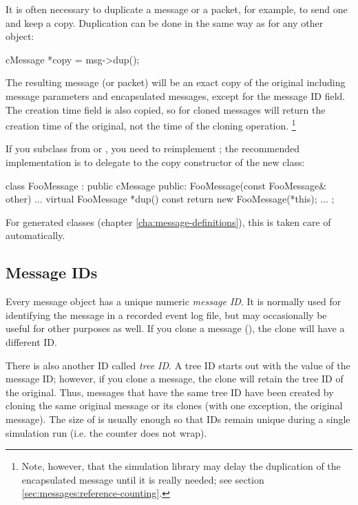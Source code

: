 It is often necessary to duplicate a message or a packet, for example,
to send one and keep a copy. Duplication can be done in the same way as
for any other {\opp} object:

\begin{cpp}
cMessage *copy = msg->dup();
\end{cpp}

The resulting message (or packet) will be an exact copy of the original
including message parameters and encapsulated messages, except for the
message ID field. The creation time field is also copied, so
for cloned messages  will return the creation
time of the original, not the time of the cloning operation.
  \footnote{Note, however, that the simulation library may delay the
  duplication of the encapsulated message until it is really needed;
  see section \ref{sec:messages:reference-counting}.}

If you subclass from  or , you need
to reimplement ; the recommended implementation is to delegate
to the copy constructor of the new class:

\begin{cpp}
class FooMessage : public cMessage {
  public:
    FooMessage(const FooMessage& other) {...}
    virtual FooMessage *dup() const {return new FooMessage(*this);}
    ...
};
\end{cpp}

For generated classes (chapter \ref{cha:message-definitions}), this is
taken care of automatically.


\subsection{Message IDs}

Every message object has a unique numeric \textit{message ID}. It is normally
used for identifying the message in a recorded event log file, but may occasionally
be useful for other purposes as well. If you clone a message (),
the clone will have a different ID.

There is also another ID called \textit{tree ID}. A tree ID starts out with
the value of the message ID; however, if you clone a message, the clone
will retain the tree ID of the original. Thus, messages that have the same
tree ID have been created by cloning the same original message or its
clones (with one exception, the original message).  The size of 
is usually enough so that IDs remain unique during a single simulation run
(i.e. the counter does not wrap).

